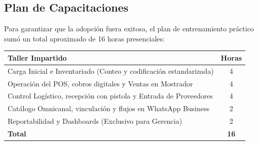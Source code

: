 \subsection{Plan de Capacitaciones}
Para garantizar que la adopción fuera exitosa, el plan de entrenamiento práctico sumó un total aproximado de 16 horas presenciales:

\begin{table}[H]
\centering
\renewcommand{\arraystretch}{1.2}
\begin{tabular}{|p{10cm}|c|}
\hline
\rowcolor{gray!20}
\textbf{Taller Impartido} & \textbf{Horas} \\ \hline
Carga Inicial e Inventariado (Conteo y codificación estandarizada) & 4 \\ \hline
Operación del POS, cobros digitales y Ventas en Mostrador & 4 \\ \hline
Control Logístico, recepción con pistola y Entrada de Proveedores & 4 \\ \hline
Catálogo Omnicanal, vinculación y flujos en WhatsApp Business & 2 \\ \hline
Reportabilidad y Dashboards (Exclusivo para Gerencia) & 2 \\ \hline
\rowcolor{gray!10}
\textbf{Total} & \textbf{16} \\ \hline
\end{tabular}
\end{table}
